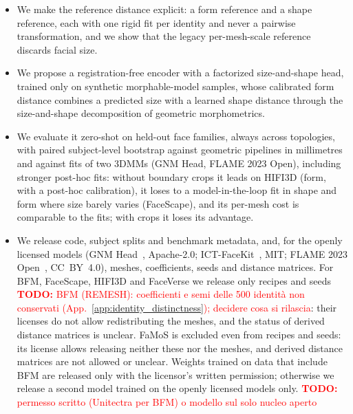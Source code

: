 \documentclass[10pt,twocolumn,letterpaper]{article}
\newcommand{\todo}[1]{\textcolor{red}{\textbf{TODO:} #1}}
\begin{document}
\begin{itemize}
\item We make the reference distance explicit: a form reference and a shape reference, each with one rigid fit per identity and never a pairwise transformation, and we show that the legacy per-mesh-scale reference discards facial size. %
\item We propose a registration-free encoder with a factorized size-and-shape head, trained only on synthetic morphable-model samples, whose calibrated form distance combines a predicted size with a learned shape distance through the size-and-shape decomposition of geometric morphometrics.
\item We evaluate it zero-shot on held-out face families, always across topologies, with paired subject-level bootstrap against geometric pipelines in millimetres and against fits of two 3DMMs (GNM Head, FLAME 2023 Open), including stronger post-hoc fits: without boundary crops it leads on HIFI3D (form, with a post-hoc calibration), it loses to a model-in-the-loop fit in shape and form where size barely varies (FaceScape), and its per-mesh cost is comparable to the fits; with crops it loses its advantage. %
\item We release code, subject splits and benchmark metadata, and, for the openly licensed models (GNM Head~\cite{ploumpis2026gnmhead}, Apache-2.0; ICT-FaceKit~\cite{ict-facekit}, MIT; FLAME 2023 Open~\cite{li2017flame}, CC~BY~4.0), meshes, coefficients, seeds and distance matrices. For BFM, FaceScape, HIFI3D and FaceVerse we release only recipes and seeds \todo{BFM (REMESH): coefficienti e semi delle 500 identit\`a non conservati (App.~\ref{app:identity_distinctness}); decidere cosa si rilascia}: their licenses do not allow redistributing the meshes, and the status of derived distance matrices is unclear. FaMoS is excluded even from recipes and seeds: its license allows releasing neither these nor the meshes, and derived distance matrices are not allowed or unclear. Weights trained on data that include BFM are released only with the licensor's written permission; otherwise we release a second model trained on the openly licensed models only. \todo{permesso scritto (Unitectra per BFM) o modello sul solo nucleo aperto}
\end{itemize}
\end{document}
